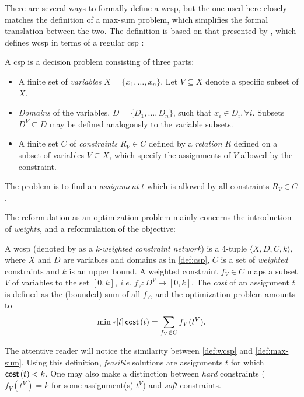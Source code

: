 There are several ways to formally define a \gls{wcsp}, but the one used here closely matches the definition of a max-sum problem, which simplifies the formal translation between the two. The definition is based on that presented by \textcite{Meseguer06}, which defines \gls{wcsp} \parencite[\pno~284]{Meseguer06} in terms of a regular \gls{csp} \parencite[\pno~281]{Meseguer06}:
\begin{definition} \label{def:csp}
	A \gls{csp} is a decision problem consisting of three parts:
	\begin{itemize}
		\item A finite set of \emph{variables} \(X = \{x_1, \dotsc, x_n\}\). Let \(V \subseteq X\) denote a specific subset of \(X\).
		\item \emph{Domains} of the variables, \(D = \{D_1, \dotsc, D_n\}\), such that \(x_i \in D_i, \forall i\). Subsets \(D^V \subseteq D\) may be defined analogously to the variable subsets.
		\item A finite set \(C\) of \emph{constraints} \(R_V\in C\) defined by a \emph{relation} \(R\) defined on a subset of variables \(V\subseteq X\), which specify the assignments of \(V\) allowed by the constraint.
	\end{itemize}
	The problem is to find an \emph{assignment} \(t\) which is allowed by all constraints \(R_V\in C\).
\end{definition}

The reformulation as an optimization problem mainly concerns the introduction of \emph{weights}, and a reformulation of the objective:
\begin{definition} \label{def:wcsp}
	A \gls{wcsp} (denoted by \textcite[\pno~284]{Meseguer06} as a \emph{k-weighted constraint network}) is a 4-tuple \(\langle X, D, C, k\rangle\), where \(X\) and \(D\) are variables and domains as in \cref{def:csp}, \(C\) is a set of \emph{weighted} constraints and \(k\) is an upper bound.
	A weighted constraint \(f_V\in C\) maps a subset \(V\) of variables to the set \([0,k]\), \emph{i.e.} \(f_V : D^V \mapsto [0,k]\).
	The \emph{cost} of an assignment \(t\) is defined as the (bounded) sum of all \(f_V\), and the optimization problem amounts to
	\begin{equation*}
		\min*[t] \operatorname{\mathsf{cost}}\left(t\right) = \sum_{f_V\in C} f_V(t^V).
	\end{equation*}
\end{definition}

The attentive reader will notice the similarity between \cref{def:wcsp} and \cref{def:max-sum}.
Using this definition, \emph{feasible} solutions are assignments \(t\) for which \(\operatorname{\mathsf{cost}}\left(t\right) < k\).
One may also make a distinction between \emph{hard} constraints (\(f_V(t^V) = k\) for some assignment(s) \(t^V\)) and \emph{soft} constraints.

